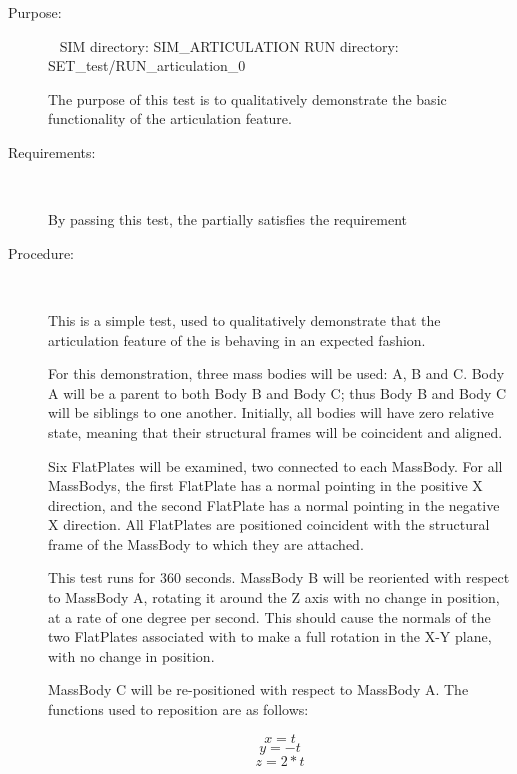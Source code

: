 \label{test:art_test_0}

\begin{description}

\item[Purpose:] \ \newline
SIM directory: SIM\_ARTICULATION
RUN directory: SET\_test/RUN\_articulation\_0

The purpose of this test is to qualitatively demonstrate the 
basic functionality of the articulation feature.

\item[Requirements:] \ \newline

By passing this test, the \ModelDesc partially satisfies
the requirement 

\item[Procedure:] \ \newline

This is a simple test, used to qualitatively demonstrate that
the articulation feature of the \ModelDesc is behaving
in an expected fashion.

For this demonstration, three mass bodies will be used: A, B and C.
Body A will be a parent to both Body B and Body C; thus
Body B and Body C will be siblings to one another. Initially,
all bodies will have zero relative state, meaning that their
structural frames will be coincident and aligned.

Six FlatPlates will be examined, two connected to each MassBody.
For all MassBodys, the first FlatPlate has a normal pointing in
the positive X direction, and the second FlatPlate has a normal
pointing in the negative X direction. All FlatPlates are positioned
coincident with the structural frame of the MassBody to which
they are attached.

This test runs for 360 seconds. MassBody B will be reoriented with respect to
MassBody A, rotating it around the Z axis with no change in position, at a rate of
one degree per second. This should cause the
normals of the two FlatPlates associated with to make a full rotation in the X-Y plane, with
no change in position.

MassBody C will be re-positioned with respect to MassBody A. The
functions used to reposition are as follows:

\begin{equation}\label{position_equation_1}
x = t
\end{equation}
\begin{equation}\label{position_equation_2}
y = -t
\end{equation}
\begin{equation}\label{position_equation_3}
z = 2 * t
\end{equation}


\end{description}
